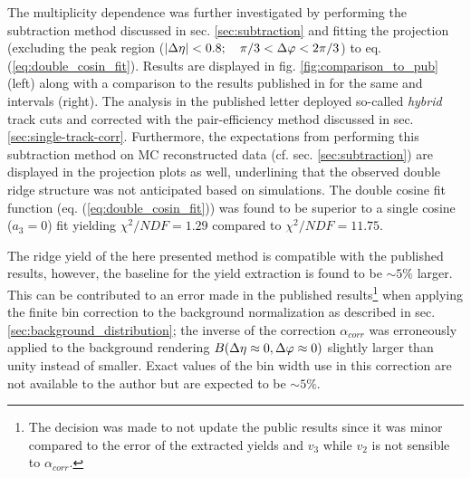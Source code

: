 The multiplicity dependence was further investigated by performing the subtraction method discussed in sec. \ref{sec:subtraction} and fitting the \dphi projection (excluding the peak region ($|\Delta\eta| < 0.8;  \quad \pi /3 < \Delta\varphi < 2 \pi /3$) to eq. (\ref{eq:double_cosin_fit}). Results are displayed in fig. \ref{fig:comparison_to_pub} (left) along with a comparison to the results published in \cite{Abelev2012} for the same \ptassoc and \pttrig intervals (right). The analysis in the published letter deployed so-called \emph{hybrid} track cuts and corrected with the pair-efficiency method discussed in sec. \ref{sec:single-track-corr}. Furthermore, the expectations from performing this subtraction method on MC reconstructed data (cf. sec. \ref{sec:subtraction}) are displayed in the projection plots as well, underlining that the observed double ridge structure was not anticipated based on simulations. The double cosine fit function (eq. (\ref{eq:double_cosin_fit})) was found to be superior to a single cosine ($a_3 = 0$) fit yielding $\chi ^2 / NDF = 1.29$ compared to $\chi^2 / NDF = 11.75$.

The ridge yield of the here presented method is compatible with the published results, however, the baseline for the yield extraction is found to be  $\sim 5\%$ larger. This can be contributed to an error made in the published results\footnote{The decision was made to not update the public results since it was minor compared to the error of the extracted yields and $v_3$ while $v_2$ is not sensible to $\alpha_{corr}$.}  when applying the finite bin correction to the background normalization as described in sec. \ref{sec:background_distribution}; the inverse of the correction $\alpha_{corr}$ was erroneously applied to the background rendering $B(\Delta\eta \approx 0, \Delta\varphi \approx 0)$ slightly larger than unity instead of smaller. Exact values of the bin width use in this correction are not available to the author but are expected to be $\sim 5\%$.

